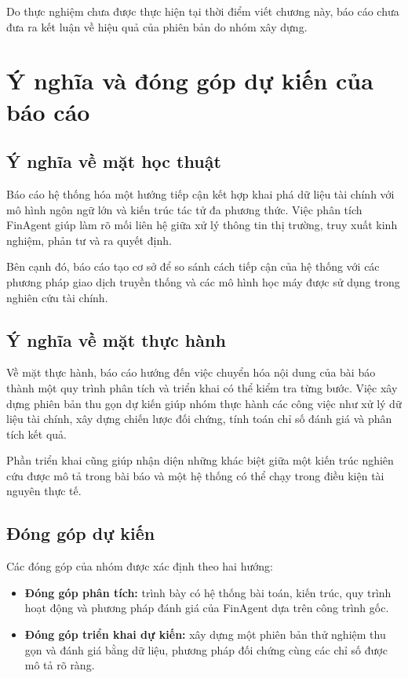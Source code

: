 Do thực nghiệm chưa được thực hiện tại thời điểm viết chương này, báo cáo chưa đưa ra kết luận về hiệu quả của phiên bản do nhóm xây dựng.

\section{Ý nghĩa và đóng góp dự kiến của báo cáo}

\subsection{Ý nghĩa về mặt học thuật}

Báo cáo hệ thống hóa một hướng tiếp cận kết hợp khai phá dữ liệu tài chính với mô hình ngôn ngữ lớn và kiến trúc tác tử đa phương thức. Việc phân tích FinAgent giúp làm rõ mối liên hệ giữa xử lý thông tin thị trường, truy xuất kinh nghiệm, phản tư và ra quyết định.

Bên cạnh đó, báo cáo tạo cơ sở để so sánh cách tiếp cận của hệ thống với các phương pháp giao dịch truyền thống và các mô hình học máy được sử dụng trong nghiên cứu tài chính.

\subsection{Ý nghĩa về mặt thực hành}

Về mặt thực hành, báo cáo hướng đến việc chuyển hóa nội dung của bài báo thành một quy trình phân tích và triển khai có thể kiểm tra từng bước. Việc xây dựng phiên bản thu gọn dự kiến giúp nhóm thực hành các công việc như xử lý dữ liệu tài chính, xây dựng chiến lược đối chứng, tính toán chỉ số đánh giá và phân tích kết quả.

Phần triển khai cũng giúp nhận diện những khác biệt giữa một kiến trúc nghiên cứu được mô tả trong bài báo và một hệ thống có thể chạy trong điều kiện tài nguyên thực tế.

\subsection{Đóng góp dự kiến}

Các đóng góp của nhóm được xác định theo hai hướng:

\begin{itemize}
    \item \textbf{Đóng góp phân tích:} trình bày có hệ thống bài toán, kiến trúc, quy trình hoạt động và phương pháp đánh giá của FinAgent dựa trên công trình gốc.

    \item \textbf{Đóng góp triển khai dự kiến:} xây dựng một phiên bản thử nghiệm thu gọn và đánh giá bằng dữ liệu, phương pháp đối chứng cùng các chỉ số được mô tả rõ ràng.
\end{itemize}

